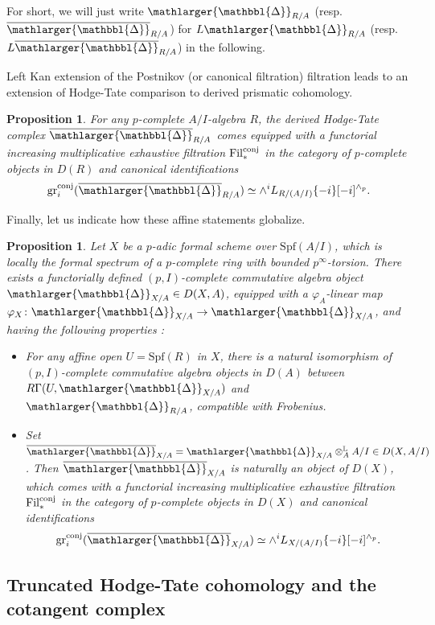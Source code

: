 \documentclass{amsart}
\newcommand{\prism}{{\mathlarger{\mathbbl{\Delta}}}}
\theoremstyle{plain}
\newtheorem{proposition}[theorem]{Proposition}
\theoremstyle{definition}
\newcommand{\red}[1]{{\color{black} #1}}
\begin{document}
For short, we will just write $\prism_{R/A}$ (resp. $\overline{\prism}_{R/A}$) for $L\prism_{R/A}$ (resp. $L\overline{\prism}_{R/A}$) in the following.

Left Kan extension of the Postnikov (or canonical filtration) filtration leads to an extension of Hodge-Tate comparison to derived prismatic cohomology.

\begin{proposition}
\label{sec:hodge-tate-comp-general}
For any $p$-complete $A/I$-algebra $R$, the derived Hodge-Tate complex $\overline{\prism}_{R/A}$ comes equipped with a functorial increasing multiplicative exhaustive filtration $\mathrm{Fil}_*^{\rm conj}$ in the category of $p$-complete objects in $D(R)$ and canonical identifications 
\[ \mathrm{gr}_i^{\rm conj}(\overline{\prism}_{R/A}) \simeq \wedge^i L_{R/(A/I)}\{-i\}[-i]^{\wedge_p}. \]
\end{proposition}

Finally, let us indicate how these affine statements globalize. 

\begin{proposition}
\label{sec:derived-prism-cohom-global}
Let $X$ be a $p$-adic formal scheme over $\mathrm{Spf}(A/I)$, \red{which is locally the formal spectrum of a $p$-complete ring with bounded $p^{\infty}$-torsion}. There exists a functorially defined $(p,I)$-complete commutative algebra object $\prism_{X/A} \in D(X,A)$, equipped with a $\varphi_A$-linear map $\varphi_X\colon \prism_{X/A} \to \prism_{X/A}$, and having the following properties :
\begin{itemize}
\item For any affine open $U=\mathrm{Spf}(R)$ in $X$, there is a natural isomorphism of $(p,I)$-complete commutative algebra objects in $D(A)$ between $R\Gamma(U,\prism_{X/A})$ and $\prism_{R/A}$, compatible with Frobenius. 
\item Set $\overline{\prism}_{X/A}=\prism_{X/A} \otimes_A^{\mathbb{L}} A/I \in D(X,A/I)$. Then $\overline{\prism}_{X/A}$ is naturally an object of $D(X)$, which comes with a functorial increasing multiplicative exhaustive filtration $\mathrm{Fil}_*^{\rm conj}$ in the category of $p$-complete objects in $D(X)$ and canonical identifications 
\[ \mathrm{gr}_i^{\rm conj}(\overline{\prism}_{X/A}) \simeq \wedge^i L_{X/(A/I)}\{-i\}[-i]^{\wedge_p}. \]
\end{itemize}
\end{proposition}



\subsection{Truncated Hodge-Tate cohomology and the cotangent complex}
\label{sec:trunc-prism-cotang-complex}
\end{document}
